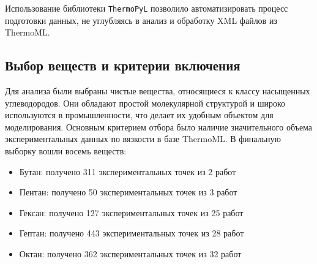 \documentclass[a4paper,12pt]{article}
\begin{document}
      Использование библиотеки \texttt{ThermoPyL} позволило автоматизировать процесс подготовки данных, не углубляясь в анализ и обработку XML файлов из ThermoML.
    
  \subsection{Выбор веществ и критерии включения}
  
  Для анализа были выбраны чистые вещества, относящиеся к классу насыщенных углеводородов. Они обладают простой молекулярной структурой и широко используются в промышленности, что делает их удобным объектом для моделирования. Основным критерием отбора было наличие значительного объема экспериментальных данных по вязкости в базе ThermoML. В финальную выборку вошли восемь веществ:
    \begin{itemize}
      \item Бутан: получено 311 экспериментальных точек из 2 работ \cite{acs.jced.5b00654,s10765-006-0053-2}
      \item Пентан: получено 50 экспериментальных точек из 3 работ \cite{acs.jced.7b00650,j.jct.2005.10.011,je0501944}
      \item Гексан: получено 127 экспериментальных точек из 25 работ \cite{acs.jced.5b00152,acs.jced.8b00589,j.fluid.2013.07.060,j.fluid.2018.08.001,j.jct.2004.09.021,j.jct.2005.03.024,j.jct.2005.07.008,j.jct.2005.10.011,j.jct.2007.05.016,j.jct.2008.02.005,j.tca.2005.10.008,je020114l,je020131a,je030107c,je034002l,je049576k,je049777o,je060389r,je060491o,je800048f,je8006138,je9006597,s10765-005-5572-8,s10765-006-0053-2,s10765-009-0622-2}
      \item Гептан: получено 443 экспериментальных точек из 28 работ \cite{acs.jced.5b00152,acs.jced.7b00121,j.fluid.2006.01.030,j.fluid.2010.10.009,j.fluid.2016.11.029,j.jct.2004.09.021,j.jct.2005.03.024,j.jct.2005.10.011,j.jct.2006.01.012,j.jct.2013.09.017,j.jct.2015.12.021,j.tca.2005.10.008,j.tca.2015.08.005,j.tca.2018.10.018,je020131a,je049662k,je049776w,je049777o,je400835u,je5007532,je600554h,je700202h,je8003707,je9006597,je900969u,s10765-009-0667-2,s10765-012-1373-z,s10765-014-1759-1}
      \item Октан: получено 362 экспериментальных точек из 32 работ \cite{acs.jced.6b00391,acs.jced.7b00121,acs.jced.7b00650,j.fluid.2010.10.009,j.jct.2003.12.005,j.jct.2004.09.021,j.jct.2005.03.024,j.jct.2005.10.011,j.jct.2006.01.012,j.jct.2007.05.016,j.jct.2008.02.005,j.jct.2013.09.017,j.jct.2014.09.015,j.tca.2005.10.008,j.tca.2015.08.005,je020131a,je034017j,je034208m,je049572f,je049776w,je0503296,je060389r,je300899n,je4004806,je400835u,je600554h,je800348s,je800417q,je9006597,s10765-006-0053-2,s10765-008-0542-6,s10765-014-1759-1}

\end{itemize}
\end{document}
